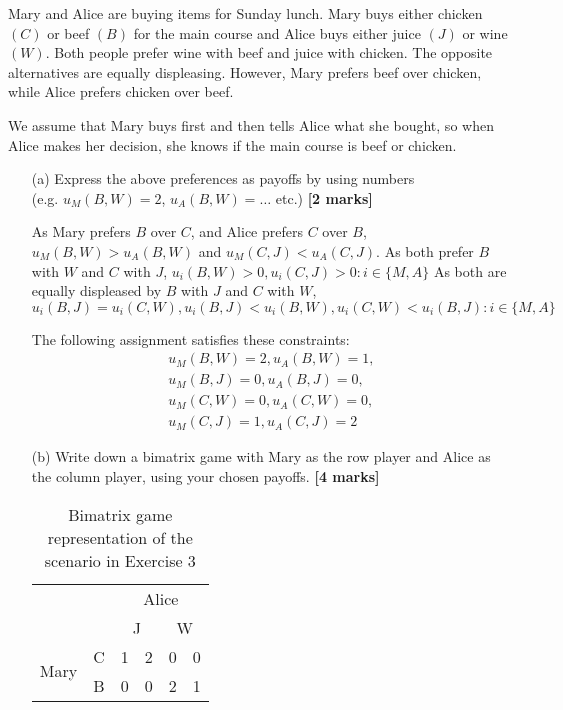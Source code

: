 
Mary and Alice are buying items for Sunday lunch. Mary buys either chicken $(C)$ or beef $(B)$ for the main course and Alice buys either juice $(J)$ 
or wine $(W)$. Both people prefer wine with beef and juice with chicken. The opposite alternatives are equally displeasing.
However, Mary prefers beef over chicken, while Alice prefers chicken over beef.

We assume that Mary buys first and then tells Alice what she bought,
so when Alice makes her decision, she knows if the main course is beef or chicken.

\begin{enumerate}
    \item[(a)] Express the above preferences as payoffs by using numbers\\
    (e.g. $u_M(B, W) = 2$, $u_A(B, W) = \ldots$  etc.) \hfill{\bf [2 marks]}\smallskip

    As Mary prefers $B$ over $C$, and Alice prefers $C$ over $B$, $u_M(B, W) > u_A(B, W)$ and $u_M(C, J) < u_A(C, J)$.
    As both prefer $B$ with $W$ and $C$ with $J$, $u_i(B, W) > 0, u_i(C, J) > 0 : i \in \{M, A\}$
    As both are equally displeased by $B$ with $J$ and $C$ with $W$, $u_i(B, J) = u_i(C, W), u_i(B, J) < u_i(B, W), u_i(C, W) < u_i(B, J) : i \in \{M, A\}$

    The following assignment satisfies these constraints:
    \begin{equation}
        \begin{split}
            u_M(B, W) = 2, u_A(B, W) = 1, \\
            u_M(B, J) = 0, u_A(B, J) = 0, \\
            u_M(C, W) = 0, u_A(C, W) = 0, \\
            u_M(C, J) = 1, u_A(C, J) = 2
        \end{split}
    \end{equation}

    \item[(b)] Write down a bimatrix game with Mary as the row player and Alice as the column player, using your chosen payoffs. \hfill{\bf [4 marks]}\smallskip

    \begin{table}[ht!]
        \centering
        \begin{tabular}{lc|cl|cl|}
        \cline{3-6}
         &  & \multicolumn{4}{c|}{Alice}                      \\ \cline{3-6} 
         &  & \multicolumn{2}{c|}{J} & \multicolumn{2}{c|}{W} \\ \hline
        \multicolumn{1}{|c|}{\multirow{2}{*}{Mary}} & C                      & 1                     & \multicolumn{1}{c|}{2} & 0                     & \multicolumn{1}{c|}{0} \\ \cline{2-6} 
        \multicolumn{1}{|c|}{}                      & \multicolumn{1}{l|}{B} & \multicolumn{1}{l}{0} & 0                      & \multicolumn{1}{l}{2} & 1                      \\ \hline
        \end{tabular}
        \caption{Bimatrix game representation of the scenario in Exercise 3}
        \label{tab:ex3b}
    \end{table}


\end{enumerate}
